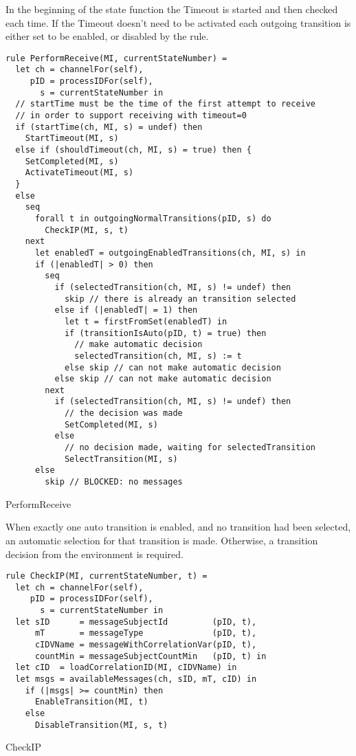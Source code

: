 In the beginning of the state function the Timeout is started and then checked each time. If the Timeout doesn't need to be activated each outgoing transition is either set to be enabled, or disabled by the  rule.


\begin{listing}[htbp]
\begin{verbatim}
rule PerformReceive(MI, currentStateNumber) =
  let ch = channelFor(self),
     pID = processIDFor(self),
       s = currentStateNumber in
  // startTime must be the time of the first attempt to receive
  // in order to support receiving with timeout=0
  if (startTime(ch, MI, s) = undef) then
    StartTimeout(MI, s)
  else if (shouldTimeout(ch, MI, s) = true) then {
    SetCompleted(MI, s)
    ActivateTimeout(MI, s)
  }
  else
    seq
      forall t in outgoingNormalTransitions(pID, s) do
        CheckIP(MI, s, t)
    next
      let enabledT = outgoingEnabledTransitions(ch, MI, s) in
      if (|enabledT| > 0) then
        seq
          if (selectedTransition(ch, MI, s) != undef) then
            skip // there is already an transition selected
          else if (|enabledT| = 1) then
            let t = firstFromSet(enabledT) in
            if (transitionIsAuto(pID, t) = true) then
              // make automatic decision
              selectedTransition(ch, MI, s) := t
            else skip // can not make automatic decision
          else skip // can not make automatic decision
        next
          if (selectedTransition(ch, MI, s) != undef) then
            // the decision was made
            SetCompleted(MI, s)
          else
            // no decision made, waiting for selectedTransition
            SelectTransition(MI, s)
      else
        skip // BLOCKED: no messages
\end{verbatim}
\caption{PerformReceive}
\label{lst:shortasm:PerformReceive}
\end{listing}




When exactly one auto transition is enabled, and no transition had been selected, an automatic selection for that transition is made. Otherwise, a transition decision from the environment is required.


\begin{listing}[htbp]
\begin{verbatim}
rule CheckIP(MI, currentStateNumber, t) =
  let ch = channelFor(self),
     pID = processIDFor(self),
       s = currentStateNumber in
  let sID      = messageSubjectId         (pID, t),
      mT       = messageType              (pID, t),
      cIDVName = messageWithCorrelationVar(pID, t),
      countMin = messageSubjectCountMin   (pID, t) in
  let cID  = loadCorrelationID(MI, cIDVName) in
  let msgs = availableMessages(ch, sID, mT, cID) in
    if (|msgs| >= countMin) then
      EnableTransition(MI, t)
    else
      DisableTransition(MI, s, t)
\end{verbatim}
\caption{CheckIP}
\label{lst:shortasm:CheckIP}
\end{listing}


